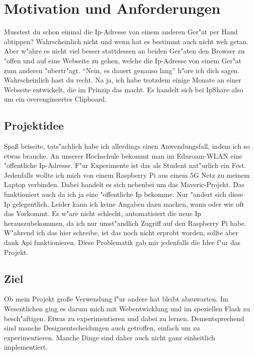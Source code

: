 
\chapter{Motivation und Anforderungen}\label{ch:motivation-und-anforderungen}
Musstest du schon einmal die Ip-Adresse von einem anderen Ger{"a}t per Hand abtippen?
Wahrscheinlich nicht und wenn hat es bestimmt auch nicht weh getan.
Aber w{"a}hre es nicht viel besser stattdessen an beiden Ger{"a}ten den Browser zu {"o}ffen und auf eine Webseite zu gehen,
welche die Ip-Adresse von einem Ger{"a}t zum anderen {"u}bertr{"a}gt.
``Nein, es dauert genauso lang'' h{"o}re ich dich sagen.
Wahrscheinlich hast du recht.
Na ja, ich habe trotzdem einige Monate an einer Webseite entwickelt, die im Prinzip das macht.
Es handelt sich bei IpShare also um ein overengineertes Clipboard.

\section{Projektidee}\label{sec:projektidee}
Spa{\ss} beiseite, tats{"a}chlich habe ich allerdings einen Anwendungsfall, indem ich so etwas brauche.
An unserer Hochschule bekommt man im Eduroam-WLAN eine {"o}ffentliche Ip-Adresse.
F{"u}r Experimente ist das als Student nat{"u}rlich ein Fest.
Jedenfalls wollte ich mich von einem Raspberry Pi aus einem 5G Netz zu meinem Laptop verbinden.
Dabei handelt es sich nebenbei um das Maveric-Projekt.
Das funktioniert auch da ich ja eine {"o}ffentliche Ip bekomme.
Nur {"a}ndert sich diese Ip gelegentlich.
Leider kann ich keine Angaben dazu machen, wann oder wie oft das Vorkommt.
Es w{"a}re nicht schlecht, automatisiert die neue Ip herauszubekommen, da ich nur umst{"a}ndlich Zugriff auf den Raspberry Pi habe.
W{"a}hrend ich das hier schreibe, ist das noch nicht erprobt worden, sollte aber dank Api funktionieren.
Diese Problematik gab mir jedenfalls die Idee f{"u}r das Projekt.

\section{Ziel}\label{sec:ziel}
Ob mein Projekt gro{\ss}e Verwendung f{"u}r andere hat bleibt abzuwarten.
Im Wesentlichen ging es darum mich mit Webentwicklung und im speziellen Flask zu besch{"a}ftigen.
Etwas zu experimentieren und dabei zu lernen.
Dementsprechend sind manche Designentscheidungen auch getroffen, einfach um zu experimentieren.
Manche Dinge sind daher auch nicht ganz einheitlich implementiert.

